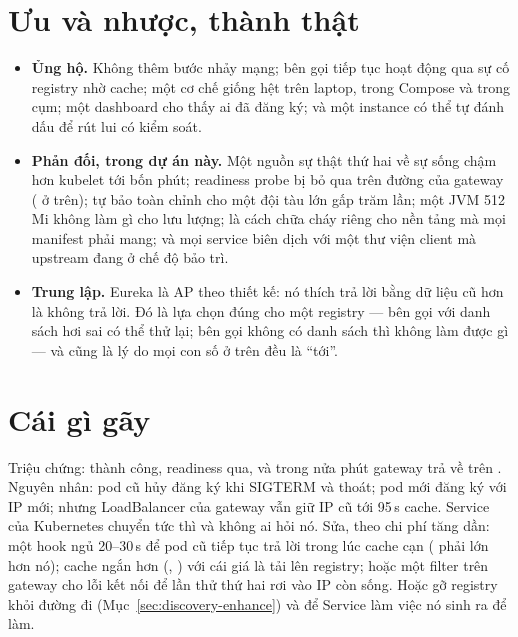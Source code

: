 \section{Ưu và nhược, thành thật}

\begin{itemize}
  \item \textbf{Ủng hộ.} Không thêm bước nhảy mạng; bên gọi tiếp tục
  hoạt động qua sự cố registry nhờ cache; một cơ chế giống hệt trên
  laptop, trong Compose và trong cụm; một dashboard cho thấy ai đã đăng
  ký; và một instance có thể tự đánh dấu  để rút
  lui có kiểm soát.
  \item \textbf{Phản đối, trong dự án này.} Một nguồn sự thật thứ hai về
  sự sống chậm hơn kubelet tới bốn phút; readiness probe bị bỏ qua trên
  đường của gateway ( ở trên); tự bảo toàn chỉnh cho một đội tàu
  lớn gấp trăm lần; một JVM 512\,Mi không làm gì cho lưu lượng;
   là cách chữa cháy riêng cho nền tảng mà mọi
  manifest phải mang; và mọi service biên dịch với một thư viện client
  mà upstream đang ở chế độ bảo trì.
  \item \textbf{Trung lập.} Eureka là AP theo thiết kế: nó thích trả lời
  bằng dữ liệu cũ hơn là không trả lời. Đó là lựa chọn đúng cho một
  registry --- bên gọi với danh sách hơi sai có thể thử lại; bên gọi
  không có danh sách thì không làm được gì --- và cũng là lý do mọi con
  số ở trên đều là ``tới''.
\end{itemize}

\section{Cái gì gãy}

\begin{pitfall}
Triệu chứng: 
thành công, readiness qua, và trong nửa phút gateway trả về  trên . Nguyên nhân: pod cũ hủy
đăng ký khi SIGTERM và thoát; pod mới đăng ký với IP mới; nhưng
LoadBalancer của gateway vẫn giữ IP cũ tới 95\,s cache. Service của
Kubernetes chuyển tức thì và không ai hỏi nó. Sửa, theo chi phí tăng
dần: một hook  ngủ 20--30\,s để pod cũ tiếp tục trả lời
trong lúc cache cạn ( phải lớn hơn
nó); cache ngắn hơn (,
) với cái giá là tải lên
registry; hoặc một filter  trên gateway cho lỗi kết nối để
lần thử thứ hai rơi vào IP còn sống. Hoặc gỡ registry khỏi đường đi
(Mục~\ref{sec:discovery-enhance}) và để Service làm việc nó sinh ra để
làm.
\end{pitfall}

